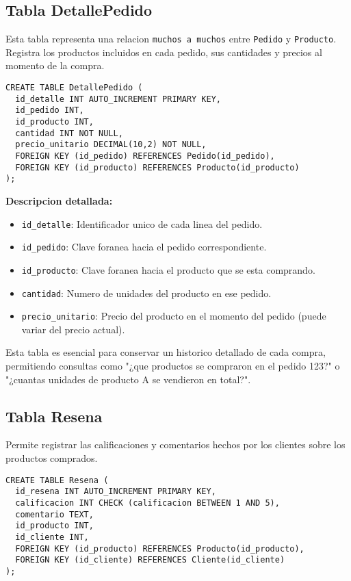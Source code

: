\subsection{Tabla DetallePedido}

Esta tabla representa una relacion \texttt{muchos a muchos} entre \texttt{Pedido} y \texttt{Producto}. Registra los productos incluidos en cada pedido, sus cantidades y precios al momento de la compra.

\begin{lstlisting}
CREATE TABLE DetallePedido (
  id_detalle INT AUTO_INCREMENT PRIMARY KEY,
  id_pedido INT,
  id_producto INT,
  cantidad INT NOT NULL,
  precio_unitario DECIMAL(10,2) NOT NULL,
  FOREIGN KEY (id_pedido) REFERENCES Pedido(id_pedido),
  FOREIGN KEY (id_producto) REFERENCES Producto(id_producto)
);
\end{lstlisting}

\textbf{Descripcion detallada:}

\begin{itemize}
  \item \texttt{id\_detalle}: Identificador unico de cada linea del pedido.
  \item \texttt{id\_pedido}: Clave foranea hacia el pedido correspondiente.
  \item \texttt{id\_producto}: Clave foranea hacia el producto que se esta comprando.
  \item \texttt{cantidad}: Numero de unidades del producto en ese pedido.
  \item \texttt{precio\_unitario}: Precio del producto en el momento del pedido (puede variar del precio actual).
\end{itemize}

Esta tabla es esencial para conservar un historico detallado de cada compra, permitiendo consultas como "¿que productos se compraron en el pedido 123?" o "¿cuantas unidades de producto A se vendieron en total?".

\subsection{Tabla Resena}

Permite registrar las calificaciones y comentarios hechos por los clientes sobre los productos comprados.

\begin{lstlisting}
CREATE TABLE Resena (
  id_resena INT AUTO_INCREMENT PRIMARY KEY,
  calificacion INT CHECK (calificacion BETWEEN 1 AND 5),
  comentario TEXT,
  id_producto INT,
  id_cliente INT,
  FOREIGN KEY (id_producto) REFERENCES Producto(id_producto),
  FOREIGN KEY (id_cliente) REFERENCES Cliente(id_cliente)
);
\end{lstlisting}

